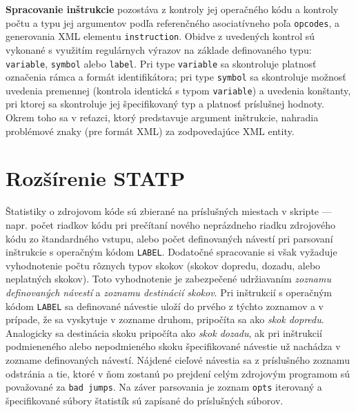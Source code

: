 \documentclass[a4paper, 10pt]{article}
\begin{document}
\textbf{Spracovanie inštrukcie} pozostáva z kontroly jej operačného kódu a kontroly počtu a typu jej argumentov podľa referenčného asociatívneho poľa \texttt{opcodes}, a generovania XML elementu \texttt{instruction}. Obidve z uvedených kontrol sú vykonané s využitím regulárnych výrazov na základe definovaného typu: \texttt{variable}, \texttt{symbol} alebo \texttt{label}. Pri type \texttt{variable} sa skontroluje platnosť označenia rámca a formát identifikátora; pri type \texttt{symbol} sa skontroluje možnosť uvedenia premennej (kontrola identická s typom \texttt{variable}) a uvedenia konštanty, pri ktorej sa skontroluje jej špecifikovaný typ a platnosť príslušnej hodnoty. Okrem toho sa v reťazci, ktorý predstavuje argument inštrukcie, nahradia problémové znaky (pre formát XML) za zodpovedajúce XML entity.

\section{Rozšírenie \textsc{STATP}}
Štatistiky o zdrojovom kóde sú zbierané na príslušných miestach v skripte --- napr. počet riadkov kódu pri prečítaní nového neprázdneho riadku zdrojového kódu zo štandardného vstupu, alebo počet definovaných návestí pri parsovaní inštrukcie s operačným kódom \texttt{LABEL}. Dodatočné spracovanie si však vyžaduje vyhodnotenie počtu rôznych typov skokov (skokov dopredu, dozadu, alebo neplatných skokov). Toto vyhodnotenie je zabezpečené udržiavaním \textit{zoznamu definovaných návestí} a \textit{zoznamu destinácií skokov}. Pri inštrukcií s operačným kódom \texttt{LABEL} sa definované návestie uloží do prvého z týchto zoznamov a v prípade, že sa vyskytuje v zozname druhom, pripočíta sa ako \textit{skok dopredu}. Analogicky sa destinácia skoku pripočíta ako \textit{skok dozadu}, ak pri inštrukcií podmieneného alebo nepodmieného skoku špecifikované návestie už nachádza v zozname definovaných návestí. Nájdené cieľové návestia sa z príslušného zoznamu odstránia a tie, ktoré v ňom zostanú po prejdení celým zdrojovým programom sú považované za \texttt{bad jumps}. Na záver parsovania je zoznam \texttt{opts} iterovaný a špecifikované súbory štatistík sú zapísané do príslušných súborov.
\end{document}
